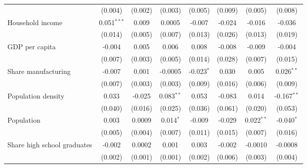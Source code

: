\begin{table}[htbp]
\begin{tabular}{lccccccc}
                                                              & (0.004)       & (0.002)      & (0.003)        & (0.005)       & (0.009)        & (0.005)        & (0.008)\\   
      Household income                                        & 0.051$^{***}$ & 0.009        & 0.0005         & -0.007        & -0.024         & -0.016         & -0.036\\   
                                                              & (0.014)       & (0.005)      & (0.007)        & (0.013)       & (0.026)        & (0.013)        & (0.019)\\   
      GDP per capita                                          & -0.004        & 0.005        & 0.006          & 0.008         & -0.008         & -0.009         & -0.004\\   
                                                              & (0.007)       & (0.003)      & (0.005)        & (0.014)       & (0.028)        & (0.007)        & (0.015)\\   
      Share manufacturing                                     & -0.007        & 0.001        & -0.0005        & -0.023$^{*}$  & 0.030          & 0.005          & 0.026$^{**}$\\   
                                                              & (0.007)       & (0.003)      & (0.003)        & (0.009)       & (0.016)        & (0.006)        & (0.009)\\   
      Population density                                      & 0.033         & -0.025       & 0.083$^{**}$   & 0.053         & -0.083         & 0.014          & -0.167$^{**}$\\   
                                                              & (0.040)       & (0.016)      & (0.025)        & (0.036)       & (0.061)        & (0.020)        & (0.053)\\   
      Population                                              & 0.003         & 0.0009       & 0.014$^{*}$    & -0.009        & -0.029         & 0.022$^{**}$   & -0.040$^{*}$\\   
                                                              & (0.005)       & (0.004)      & (0.007)        & (0.011)       & (0.015)        & (0.007)        & (0.016)\\   
      Share high school graduates                             & -0.002        & 0.0002       & 0.001          & 0.003         & -0.002         & -0.0010        & -0.0008\\   
                                                              & (0.002)       & (0.001)      & (0.001)        & (0.002)       & (0.006)        & (0.003)        & (0.004)\\   

\end{tabular}
\end{table}
